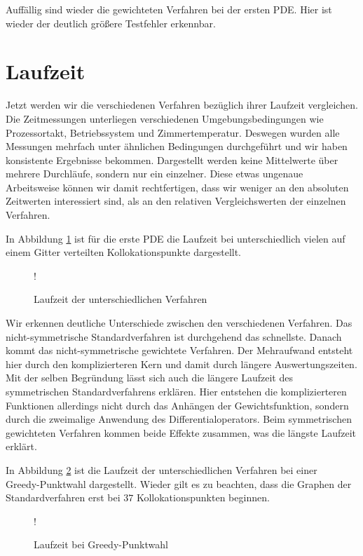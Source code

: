 Auffällig sind wieder die gewichteten Verfahren bei der ersten \ac{PDE}. Hier ist wieder der deutlich größere Testfehler erkennbar.

\section{Laufzeit}
Jetzt werden wir die verschiedenen Verfahren bezüglich ihrer Laufzeit vergleichen. Die Zeitmessungen unterliegen verschiedenen Umgebungsbedingungen wie Prozessortakt, Betriebssystem und Zimmertemperatur. Deswegen wurden alle Messungen mehrfach unter ähnlichen Bedingungen durchgeführt und wir haben konsistente Ergebnisse bekommen. Dargestellt werden keine Mittelwerte über mehrere Durchläufe, sondern nur ein einzelner. Diese etwas ungenaue Arbeitsweise können wir damit rechtfertigen, dass wir weniger an den absoluten Zeitwerten interessiert sind, als an den relativen Vergleichswerten der einzelnen Verfahren.

In Abbildung \ref{fig:Laufzeit} ist für die erste \ac{PDE} die Laufzeit bei unterschiedlich vielen auf einem Gitter verteilten Kollokationspunkte dargestellt.
\begin{figure}[ht]
\centering
\resizebox {.85\columnwidth} {!} {

}
\caption{Laufzeit der unterschiedlichen Verfahren}
\label{fig:Laufzeit}
\end{figure}

Wir erkennen deutliche Unterschiede zwischen den verschiedenen Verfahren. Das nicht-symmetrische Standardverfahren ist durchgehend das schnellste. Danach kommt das nicht-symmetrische gewichtete Verfahren. Der Mehraufwand entsteht hier durch den komplizierteren Kern und damit durch längere Auswertungszeiten. Mit der selben Begründung lässt sich auch die längere Laufzeit des symmetrischen Standardverfahrens erklären. Hier entstehen die komplizierteren Funktionen allerdings nicht durch das Anhängen der Gewichtsfunktion, sondern durch die zweimalige Anwendung des Differentialoperators. Beim symmetrischen gewichteten Verfahren kommen beide Effekte zusammen, was die längste Laufzeit erklärt.

In Abbildung \ref{fig:Laufzeit-greedy} ist die Laufzeit der unterschiedlichen Verfahren bei einer \\Greedy-Punktwahl dargestellt. Wieder gilt es zu beachten, dass die Graphen der Standardverfahren erst bei $37$ Kollokationspunkten beginnen.
\begin{figure}[ht]
\centering
\resizebox {.85\columnwidth} {!} {

}
\caption{Laufzeit bei Greedy-Punktwahl}
\label{fig:Laufzeit-greedy}
\end{figure}

